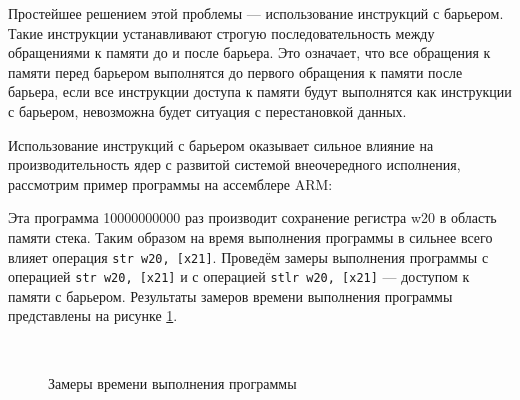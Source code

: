 Простейшее решением этой проблемы --- использование инструкций с барьером. Такие инструкции устанавливают строгую последовательность между обращениями к памяти до и после барьера. Это означает, что все обращения к памяти перед барьером выполнятся до первого обращения к памяти после барьера, если все инструкции доступа к памяти будут выполнятся как инструкции с барьером, невозможна будет ситуация с перестановкой данных.

Использование инструкций с барьером оказывает сильное влияние на производительность ядер с развитой системой внеочередного исполнения, рассмотрим пример программы на ассемблере ARM:


Эта программа 10000000000 раз производит сохранение регистра w20 в область памяти стека. Таким образом на время выполнения программы в сильнее всего влияет операция \texttt{str w20, [x21]}. Проведём замеры выполнения программы с операцией \texttt{str w20, [x21]} и с операцией \texttt{stlr w20, [x21]} --- доступом к памяти с барьером. Результаты замеров времени выполнения программы представлены на рисунке \ref{fig:speed}.

\begin{figure}[hbtp]
	\centering
	\\
	\caption{Замеры времени выполнения программы}
	\label{fig:speed}
\end{figure}

